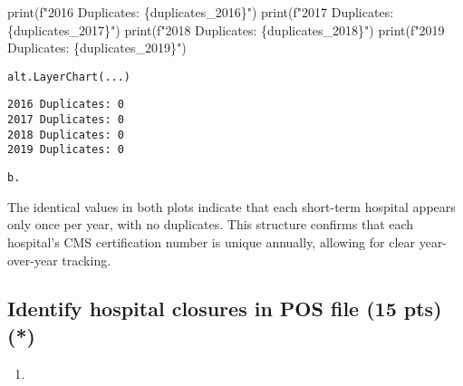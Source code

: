 \documentclass[
  letterpaper,
  DIV=11,
  numbers=noendperiod]{scrartcl}
\newenvironment{Shaded}{\begin{snugshade}}{\end{snugshade}}
\newcommand{\BuiltInTok}[1]{\textcolor[rgb]{0.00,0.23,0.31}{#1}}
\newcommand{\NormalTok}[1]{\textcolor[rgb]{0.00,0.23,0.31}{#1}}
\newcommand{\SpecialCharTok}[1]{\textcolor[rgb]{0.37,0.37,0.37}{#1}}
\newcommand{\SpecialStringTok}[1]{\textcolor[rgb]{0.13,0.47,0.30}{#1}}
\providecommand{\tightlist}{%
  \setlength{\itemsep}{0pt}\setlength{\parskip}{0pt}}\usepackage{longtable,booktabs,array}
\begin{document}
\begin{Shaded}
\begin{Highlighting}[]
\BuiltInTok{print}\NormalTok{(}\SpecialStringTok{f"2016 Duplicates: }\SpecialCharTok{\{}\NormalTok{duplicates\_2016}\SpecialCharTok{\}}\SpecialStringTok{"}\NormalTok{)}
\BuiltInTok{print}\NormalTok{(}\SpecialStringTok{f"2017 Duplicates: }\SpecialCharTok{\{}\NormalTok{duplicates\_2017}\SpecialCharTok{\}}\SpecialStringTok{"}\NormalTok{)}
\BuiltInTok{print}\NormalTok{(}\SpecialStringTok{f"2018 Duplicates: }\SpecialCharTok{\{}\NormalTok{duplicates\_2018}\SpecialCharTok{\}}\SpecialStringTok{"}\NormalTok{)}
\BuiltInTok{print}\NormalTok{(}\SpecialStringTok{f"2019 Duplicates: }\SpecialCharTok{\{}\NormalTok{duplicates\_2019}\SpecialCharTok{\}}\SpecialStringTok{"}\NormalTok{)}
\end{Highlighting}
\end{Shaded}

\begin{verbatim}
alt.LayerChart(...)
\end{verbatim}

\begin{verbatim}
2016 Duplicates: 0
2017 Duplicates: 0
2018 Duplicates: 0
2019 Duplicates: 0
\end{verbatim}

\begin{verbatim}
b.
\end{verbatim}

The identical values in both plots indicate that each short-term
hospital appears only once per year, with no duplicates. This structure
confirms that each hospital's CMS certification number is unique
annually, allowing for clear year-over-year tracking.

\subsection{Identify hospital closures in POS file (15 pts)
(*)}\label{identify-hospital-closures-in-pos-file-15-pts}

\begin{enumerate}
\def\labelenumi{\arabic{enumi}.}
\tightlist
\item
\end{enumerate}
\end{document}

